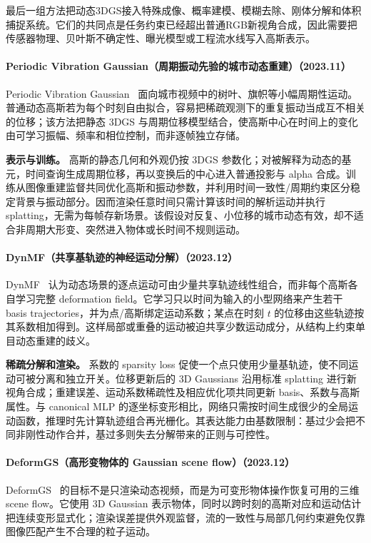 最后一组方法把动态3DGS接入特殊成像、概率建模、模糊去除、刚体分解和体积捕捉系统。它们的共同点是任务约束已经超出普通RGB新视角合成，因此需要把传感器物理、贝叶斯不确定性、曝光模型或工程流水线写入高斯表示。
\paragraph{Periodic Vibration Gaussian（周期振动先验的城市动态重建）（2023.11）}
Periodic Vibration Gaussian~\cite{2311_18561} 面向城市视频中的树叶、旗帜等小幅周期性运动。普通动态高斯若为每个时刻自由拟合，容易把稀疏观测下的重复振动当成互不相关的位移；该方法把静态 3DGS 与周期位移模型结合，使高斯中心在时间上的变化由可学习振幅、频率和相位控制，而非逐帧独立存储。

\textbf{表示与训练。} 高斯的静态几何和外观仍按 3DGS 参数化；对被解释为动态的基元，时间查询生成周期位移，再以变换后的中心进入普通投影与 alpha 合成。训练从图像重建监督共同优化高斯和振动参数，并利用时间一致性/周期约束区分稳定背景与振动部分。因而渲染任意时间只需计算该时间的解析运动并执行 splatting，无需为每帧存新场景。该假设对反复、小位移的城市动态有效，却不适合非周期大形变、突然进入物体或长时间不规则运动。

\paragraph{DynMF（共享基轨迹的神经运动分解）（2023.12）}
DynMF~\cite{2312_00112} 认为动态场景的逐点运动可由少量共享轨迹线性组合，而非每个高斯各自学习完整 deformation field。它学习只以时间为输入的小型网络来产生若干 basis trajectories，并为点/高斯绑定运动系数；某点在时刻 $t$ 的位移由这些轨迹按其系数相加得到。这样局部或重叠的运动被迫共享少数运动成分，从结构上约束单目动态重建的歧义。

\textbf{稀疏分解和渲染。} 系数的 sparsity loss 促使一个点只使用少量基轨迹，使不同运动可被分离和独立开关。位移更新后的 3D Gaussians 沿用标准 splatting 进行新视角合成；重建误差、运动系数稀疏性及相应优化项共同更新 basis、系数与高斯属性。与 canonical MLP 的逐坐标变形相比，网络只需按时间生成很少的全局运动函数，推理时先计算轨迹组合再光栅化。其表达能力由基数限制：基过少会把不同非刚性动作合并，基过多则失去分解带来的正则与可控性。

\paragraph{DeformGS（高形变物体的 Gaussian scene flow）（2023.12）}
DeformGS~\cite{2312_00583} 的目标不是只渲染动态视频，而是为可变形物体操作恢复可用的三维 scene flow。它使用 3D Gaussian 表示物体，同时以跨时刻的高斯对应和运动估计把连续变形显式化；渲染误差提供外观监督，流的一致性与局部几何约束避免仅靠图像匹配产生不合理的粒子运动。

